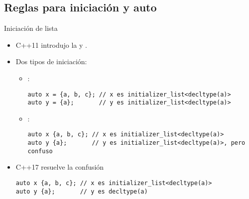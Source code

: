 \subsection{Reglas para iniciación y auto}

\begin{frame}[t,fragile]{Iniciación de lista}
\begin{itemize}
  \item C++11 introdujo la  y .
  \vfill\pause
  \item Dos tipos de iniciación:
    \begin{itemize}
      \item {}:
\begin{lstlisting}
auto x = {a, b, c}; // x es initializer_list<decltype(a)>
auto y = {a};       // y es initializer_list<decltype(a)> 
\end{lstlisting}
      \item {}:
\begin{lstlisting}
auto x {a, b, c}; // x es initializer_list<decltype(a)>
auto y {a};       // y es initializer_list<decltype(a)>, pero confuso
\end{lstlisting}
    \end{itemize}
  \vfill\pause
  \item C++17 resuelve la confusión
\begin{lstlisting}
auto x {a, b, c}; // x es initializer_list<decltype(a)>
auto y {a};       // y es decltype(a)
\end{lstlisting}
\end{itemize}
\end{frame}  
